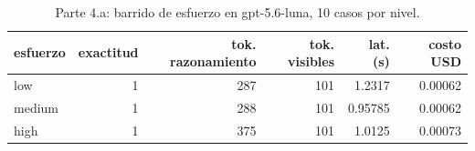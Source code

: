 \begin{table}[H]\centering\caption{Parte 4.a: barrido de esfuerzo en gpt-5.6-luna, 10 casos por nivel.}\label{tab:p4a}
{\footnotesize\setlength{\tabcolsep}{3.5pt}
\begin{tabular}{lrrrrr}
\hline
esfuerzo & exactitud & tok. razonamiento & tok. visibles & lat. (s) & costo USD \\
\hline
low & 1 & 287 & 101 & 1.2317 & 0.00062 \\
medium & 1 & 288 & 101 & 0.95785 & 0.00062 \\
high & 1 & 375 & 101 & 1.0125 & 0.00073 \\
\hline
\end{tabular}
}\end{table}
